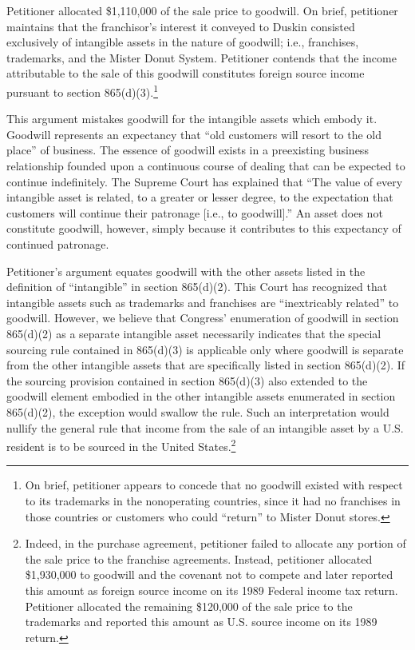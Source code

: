 \begin{select}
Petitioner allocated \$1,110,000 of the sale price to goodwill. On brief, petitioner maintains that the franchisor's interest
it conveyed to Duskin consisted exclusively of intangible assets in the nature of goodwill; i.e., franchises, trademarks, and
the Mister Donut System. Petitioner contends that the income attributable to the sale of this goodwill constitutes foreign
source income pursuant to section 865(d)(3).\footnote[15]{On brief, petitioner appears to concede that no goodwill existed with respect to its trademarks in the nonoperating countries, since it had no franchises in those countries or customers who could ``return'' to Mister Donut stores.}

This argument mistakes goodwill for the intangible assets which embody it. Goodwill represents an expectancy that
``old customers will resort to the old place'' of business. The essence of goodwill exists in a preexisting business relationship founded upon a continuous course of dealing that can be expected to continue
indefinitely.  The Supreme Court has explained that ``The value of every intangible asset is related, to a greater or lesser degree,
to the expectation that customers will continue their patronage [i.e., to goodwill].'' An asset does not constitute goodwill, however, simply because it contributes to this expectancy of continued patronage.


Petitioner's argument equates goodwill with the other assets listed in the definition of ``intangible'' in section 865(d)(2). This Court has recognized that intangible assets such as trademarks and franchises are ``inextricably related'' to
goodwill. However, we believe that Congress' enumeration of goodwill in section 865(d)(2) as a separate intangible asset necessarily indicates that the special sourcing rule contained in 865(d)(3) is applicable only where goodwill is separate from the other intangible assets that are specifically listed in section 865(d)(2). If the sourcing provision contained in section 865(d)(3) also extended to the goodwill element embodied in the other intangible assets enumerated in section 865(d)(2), the exception would swallow the rule. Such an interpretation would nullify the general rule that income from the sale of an intangible asset by a U.S. resident is to be sourced in the United States.\footnote[16]{Indeed, in the purchase agreement, petitioner failed to allocate any portion of the sale price to the franchise
agreements. Instead, petitioner allocated \$1,930,000 to goodwill and the covenant not to compete and later reported
this amount as foreign source income on its 1989 Federal income tax return. Petitioner allocated the remaining
\$120,000 of the sale price to the trademarks and reported this amount as U.S. source income on its 1989 return.}


\end{select}
